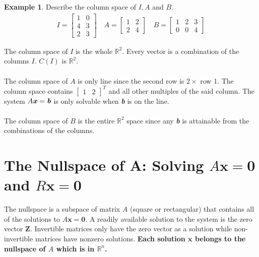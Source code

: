 \documentclass[12pt, letterpaper]{article}
\newcommand{\R}[1]{$\mathbb{R}^{#1}$}
\newcommand{\Vector}[1]{$\textbf{#1}$}
\newcommand{\V}[1]{\textbf{\textit{#1}}}
\newcommand{\DefinitionSpace}{\vspace{15px}}
\theoremstyle{definition}
\newtheorem{example}{Example}
\begin{document}
	
	\DefinitionSpace
		\begin{example}
			Describe the column space of $I, A$ and $B$.
			\begin{gather*}
				I = \begin{bmatrix} 1&0 \\ 4&3 \\2&3 \end{bmatrix} \quad A = \begin{bmatrix} 1&2 \\ 2&4 \end{bmatrix} \quad B = \begin{bmatrix} 1&2&3 \\ 0&0&4 \end{bmatrix}
			\end{gather*}
			
			\noindent The column space of $I$ is the whole \R{2}. Every vector is a combination of the columns $I$. $C(I)$ is \R{2}. \\ \\
			
			The column space of $A$ is only line since the second row is $2 \times$ row 1. The column space contains $\begin{bmatrix} 1 & 2 \end{bmatrix}^T$ and all other multiples of the said column. The system $A\V{x} = \V{b}$ is only solvable when \V{b} is on the line. \\\\
			
			The column space of $B$ is the entire \R{2} space since any \V{b} is attainable from the combinations of the columns.
			
		\end{example}
	\DefinitionSpace
	

\section{The Nullspace of A: Solving $A\textbf{x} = \textbf{0}$ and $R\textbf{x} = \textbf{0}$}
	The nullspace is a subspace of matrix $A$ (square or rectangular) that contains all of the solutions to $A\textbf{x} = \textbf{0}$. A readily available solution to the system is the zero vector \Vector{Z}. Invertible matrices only have the zero vector as a solution while non-invertible matrices have nonzero solutions. \textbf{Each solution \Vector{x} belongs to the nullspace of $A$ which is in \R{n}.}
		
\end{document}
